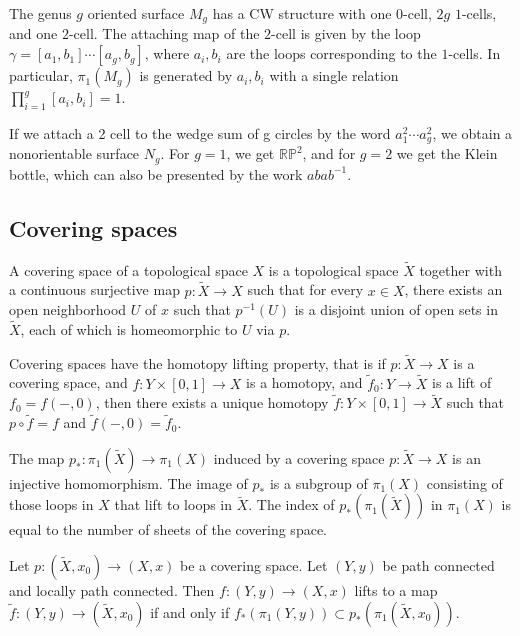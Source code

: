 \documentclass[12pt]{article}
\begin{document}
\begin{example}
    The genus $g$ oriented surface $M_g$ has a CW structure with one $0$-cell, $2g$ $1$-cells, and one $2$-cell. The attaching map of the $2$-cell is given by the loop $\gamma = [a_1,b_1]\cdots [a_g,b_g]$, where $a_i,b_i$ are the loops corresponding to the $1$-cells. In particular, $\pi_1(M_g)$ is generated by $a_i,b_i$ with a single relation $\prod_{i=1}^g [a_i,b_i]=1$.
\end{example}

\begin{example}
    If we attach a 2 cell to the wedge sum of g circles by the word $a_1^2\cdots a_g^2$, we obtain a nonorientable surface $N_g$. For $g=1$, we get $\mathbb{RP}^2$, and for $g=2$ we get the Klein bottle, which can also be presented by the work $abab^{-1}$.
\end{example}

\subsection{Covering spaces}
A covering space of a topological space $X$ is a topological space $\tilde X$ together with a continuous surjective map $p : \tilde X \to X$ such that for every $x \in X$, there exists an open neighborhood $U$ of $x$ such that $p^{-1}(U)$ is a disjoint union of open sets in $\tilde X$, each of which is homeomorphic to $U$ via $p$.

\begin{proposition}
    Covering spaces have the homotopy lifting property, that is if $p : \tilde X \to X$ is a covering space, and $f : Y \times [0,1] \to X$ is a homotopy, and $\tilde f_0 : Y \to \tilde X$ is a lift of $f_0 = f(-,0)$, then there exists a unique homotopy $\tilde f : Y \times [0,1] \to \tilde X$ such that $p \circ \tilde f = f$ and $\tilde f(-,0) = \tilde f_0$.
\end{proposition}

\begin{theorem}
    The map $p_* : \pi_1(\tilde X) \to \pi_1(X)$ induced by a covering space $p : \tilde X \to X$ is an injective homomorphism. The image of $p_*$ is a subgroup of $\pi_1(X)$ consisting of those loops in $X$ that lift to loops in $\tilde X$. The index of $p_*(\pi_1(\tilde X))$ in $\pi_1(X)$ is equal to the number of sheets of the covering space.
\end{theorem}

\begin{theorem}
    Let $p: (\tilde X, x_0) \to (X, x)$ be a covering space. Let $(Y,y)$ be path connected and locally path connected. Then $f: (Y,y) \to (X,x)$ lifts to a map $\tilde f : (Y,y) \to (\tilde X,x_0)$ if and only if $f_*(\pi_1(Y,y)) \subset p_*(\pi_1(\tilde X,x_0))$.
\end{theorem}
\end{document}
